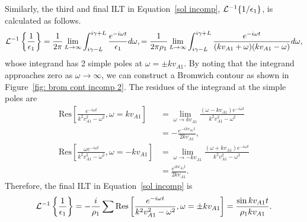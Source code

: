 \documentclass{aastex61}
\begin{document}
Similarly, the third and final ILT in Equation~\eqref{sol incomp}, $\mathcal{L}^{-1}\{ 1 / \epsilon_1 \}$, is calculated as follows.
\begin{equation}
\mathcal{L}^{-1}\left\{ \frac{1}{\e_1} \right\} = \frac{1}{2\pi}\lim_{L \to \infty} \int_{i\gamma - L}^{i\gamma + L} \frac{e^{-i\omega t}}{\e_1} d\omega,
= \frac{1}{2\pi\rho_1}\lim_{L \to \infty} \int_{i\gamma - L}^{i\gamma + L} \frac{e^{-i\omega t}}{(kv_{A1} + \omega)(kv_{A1} - \omega)} d\omega,
\end{equation}
whose integrand has 2 simple poles at $\omega = \pm k v_{A1}$. By noting that the integrand approaches zero as $\omega \to \infty$, we can construct a Bromwich contour as shown in Figure~\ref{fig: brom cont incomp 2}. The residues of the integrand at the simple poles are
\begin{align}
\mathrm{Res}\left[\frac{e^{-i\omega t}}{k^2v_{A1}^2 - \omega^2}, \omega = kv_{A1} \right] &= 
\lim_{\omega \to kv_{A1}} \frac{(\omega - kv_{A1}) e^{-i\omega t}}{k^2v_{A1}^2 - \omega^2} \\ 
&= -\frac{e^{-ikv_{A1} t}}{2kv_{A1}}, \\
\mathrm{Res}\left[\frac{\omega e^{-i\omega t}}{k^2v_{A1}^2 - \omega^2}, \omega = -kv_{A1} \right] &= 
\lim_{\omega \to -kv_{A1}} \frac{(\omega + kv_{A1}) e^{-i\omega t}}{k^2v_{A1}^2 - \omega^2} \\ 
&= \frac{e^{ikv_{A1} t}}{2kv_{A1}}.
\end{align}
Therefore, the final ILT in Equation~\eqref{sol incomp} is
\begin{equation}
\mathcal{L}^{-1}\left\{ \frac{1}{\e_1} \right\} = -\frac{i}{\rho_1} \sum \mathrm{Res} \left[ \frac{e^{-i\omega t}}{k^2v_{A1}^2 - \omega^2}, \omega = \pm kv_{A1} \right] = \frac{\sin{kv_{A1}t}}{\rho_1kv_{A1}}.
\end{equation}
\end{document}
